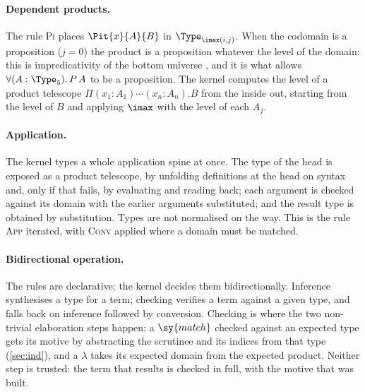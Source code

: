 \paragraph{Dependent products.}
The rule \textsc{Pi} places $\Pit{x}{A}{B}$ in $\Type_{\imax(i,j)}$.
When the codomain is a proposition ($j=0$) the product is a proposition whatever the level of the domain: this is impredicativity of the bottom universe \citep{coquand88cc}, and it is what allows $\forall (A:\Type_5).\,P\,A$ to be a proposition.
The kernel computes the level of a product telescope $\Pi(x_1{:}A_1)\cdots(x_n{:}A_n).B$ from the inside out, starting from the level of $B$ and applying $\imax$ with the level of each $A_j$.

\paragraph{Application.}
The kernel types a whole application spine at once.
The type of the head is exposed as a product telescope, by unfolding definitions at the head on syntax and, only if that fails, by evaluating and reading back; each argument is checked against its domain with the earlier arguments substituted; and the result type is obtained by substitution.
Types are not normalised on the way.
This is the rule \textsc{App} iterated, with \textsc{Conv} applied where a domain must be matched.

\paragraph{Bidirectional operation.}
The rules are declarative; the kernel decides them bidirectionally.
Inference synthesises a type for a term; checking verifies a term against a given type, and falls back on inference followed by conversion.
Checking is where the two non-trivial elaboration steps happen: a $\sy{match}$ checked against an expected type gets its motive by abstracting the scrutinee and its indices from that type (\cref{sec:ind}), and a $\lambda$ takes its expected domain from the expected product.
Neither step is trusted: the term that results is checked in full, with the motive that was built.

